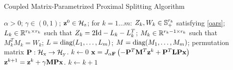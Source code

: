\begin{algorithm} 
    \caption{Coupled Matrix-Parametrized Proximal Splitting Algorithm}\label{coupled_alg} 
    \begin{algorithmic}[1] 
    \Require $\alpha > 0$; $\gamma \in (0,1)$; $\mathbf{z}^0 \in \mathcal{H}_\text{z}$; for $k= 1 \dots m$: $Z_k, W_k \in \mathbb{S}_+^{r_k}$ satisfying \eqref{oars}; $L_k \in \mathbb R^{r_k \times r_k}$ such that $Z_k=2\mathrm{Id} - L_k - L_k^T$; $M_k \in \mathbb R^{r_k-1 \times r_k}$ such that $M_k^T M_k = W_k$; $L = \text{diag}{\left(L_1, \dots, L_m\right)}$; $M = \text{diag}{\left(M_1, \dots, M_m\right)}$; permutation matrix $\mathbf{P} : \mathcal{H}_\text{x} \to \mathcal{H}_\text{y}$.
    \State $k \gets 0$
    \Repeat
      \State $\mathbf{x} = J_{\alpha \mathbf{F}}\left(-\mathbf{P}^T\mathbf{M}^T\mathbf{z}^{k} + \mathbf{P}^T\mathbf{L} \mathbf{P}\mathbf{x}\right)$\label{c_itr1}
      \State $\mathbf{z}^{k+1} = \mathbf{z}^{k} + \gamma \mathbf{M} \mathbf{P} \mathbf{x}$.\label{c_itr2}
      \State $k \gets k+1$
\end{algorithmic}
\end{algorithm}